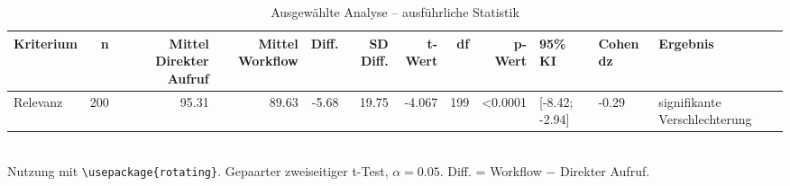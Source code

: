 \begin{table}
\centering
\caption{Ausgewählte Analyse -- ausführliche Statistik}
\begin{tabular}{lrrrrrrrrlll}
\toprule
Kriterium & n & Mittel Direkter Aufruf & Mittel Workflow & Diff. & SD Diff. & t-Wert & df & p-Wert & 95\% KI & Cohen dz & Ergebnis \\
\midrule
Relevanz & 200 & 95.31 & 89.63 & -5.68 & 19.75 & -4.067 & 199 & <0.0001 & [-8.42; -2.94] & -0.29 & signifikante Verschlechterung \\
\bottomrule
\end{tabular}
\\[2mm]
\footnotesize Nutzung mit \texttt{\textbackslash usepackage\{rotating\}}. Gepaarter zweiseitiger t-Test, $\alpha=0.05$. Diff. = Workflow $-$ Direkter Aufruf.
\end{table}
